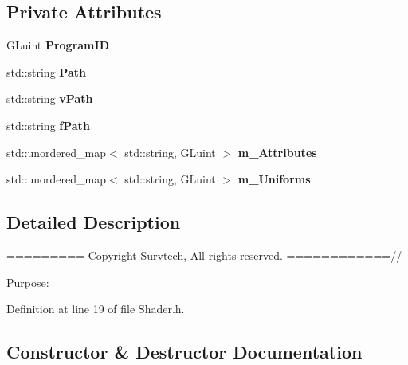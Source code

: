 \subsection*{Private Attributes}
\begin{DoxyCompactItemize}
\item 
G\+Luint {\bfseries Program\+ID}\hypertarget{class_shader_ac9d689f1297575f02843c5d9a2204785}{}\label{class_shader_ac9d689f1297575f02843c5d9a2204785}

\item 
std\+::string {\bfseries Path}\hypertarget{class_shader_af55875685fc50833e40c84f9031e15af}{}\label{class_shader_af55875685fc50833e40c84f9031e15af}

\item 
std\+::string {\bfseries v\+Path}\hypertarget{class_shader_a9676a468edf7e9e2b9f53e21e38f5b2d}{}\label{class_shader_a9676a468edf7e9e2b9f53e21e38f5b2d}

\item 
std\+::string {\bfseries f\+Path}\hypertarget{class_shader_ac6c868bb921d461e4822be81ef8fe215}{}\label{class_shader_ac6c868bb921d461e4822be81ef8fe215}

\item 
std\+::unordered\+\_\+map$<$ std\+::string, G\+Luint $>$ {\bfseries m\+\_\+\+Attributes}\hypertarget{class_shader_a41234f14f945d214b3bc41269b321523}{}\label{class_shader_a41234f14f945d214b3bc41269b321523}

\item 
std\+::unordered\+\_\+map$<$ std\+::string, G\+Luint $>$ {\bfseries m\+\_\+\+Uniforms}\hypertarget{class_shader_aaf3d64919f158cc9d51ccd2fe8ad9356}{}\label{class_shader_aaf3d64919f158cc9d51ccd2fe8ad9356}

\end{DoxyCompactItemize}


\subsection{Detailed Description}
========= Copyright Survtech, All rights reserved. ============//

Purpose\+: 

 

Definition at line 19 of file Shader.\+h.



\subsection{Constructor \& Destructor Documentation}
